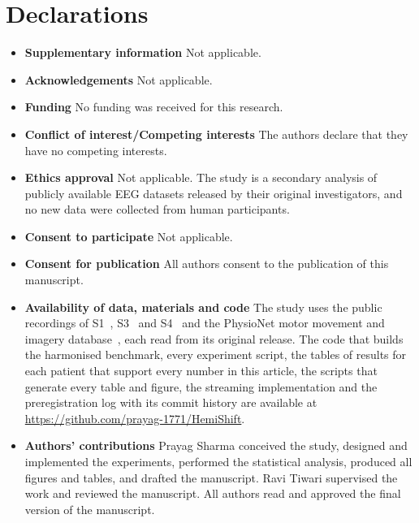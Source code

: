 \documentclass[pdflatex,sn-mathphys-num]{sn-jnl}
\begin{document}
\backmatter



\section*{Declarations}

\begin{itemize}
\item \textbf{Supplementary information} \; Not applicable.
\item \textbf{Acknowledgements} \; Not applicable.
\item \textbf{Funding} \; No funding was received for this research.
\item \textbf{Conflict of interest/Competing interests} \; The authors declare that they have no competing interests.
\item \textbf{Ethics approval} \; Not applicable. The study is a secondary analysis of publicly available EEG datasets released by their original investigators, and no new data were collected from human participants.
\item \textbf{Consent to participate} \; Not applicable.
\item \textbf{Consent for publication} \; All authors consent to the publication of this manuscript.
\item \textbf{Availability of data, materials and code} \; The study uses the public recordings of S1~\cite{liu2024}, S3~\cite{wang2026} and S4~\cite{liu2025gait} and the PhysioNet motor movement and imagery database~\cite{schalk2004,goldberger2000}, each read from its original release. The code that builds the harmonised benchmark, every experiment script, the tables of results for each patient that support every number in this article, the scripts that generate every table and figure, the streaming implementation and the preregistration log with its commit history are available at \url{https://github.com/prayag-1771/HemiShift}.
\item \textbf{Authors' contributions} \; Prayag Sharma conceived the study, designed and implemented the experiments, performed the statistical analysis, produced all figures and tables, and drafted the manuscript. Ravi Tiwari supervised the work and reviewed the manuscript. All authors read and approved the final version of the manuscript.
\end{itemize}
\end{document}
